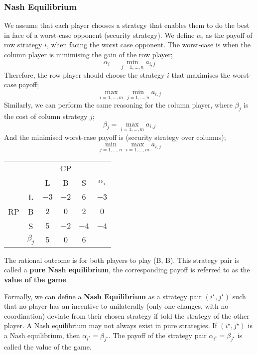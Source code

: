 \documentclass[a4paper, 12pt]{article}
\begin{document}
            \subsubsection*{Nash Equilibrium}
                We assume that each player chooses a strategy that enables them to do the best in face of a worst-case opponent (security strategy).
                We define $\alpha_i$ as the payoff of row strategy $i$, when facing the worst case opponent.
                The worst-case is when the column player is minimising the gain of the row player;
                $$\alpha_i = \min_{j = 1, \dots, n} a_{i, j}$$
                Therefore, the row player should choose the strategy $i$ that maximises the worst-case payoff;
                $$\max_{i = 1, \dots, m} \min_{j = 1, \dots, n} a_{i, j}$$
                Similarly, we can perform the same reasoning for the column player, where $\beta_j$ is the cost of column strategy $j$;
                $$\beta_j = \max_{i = 1, \dots, m} a_{i, j}$$
                And the minimised worst-case payoff is (security strategy over columns);
                $$\min_{j = 1, \dots, n} \max_{i = 1, \dots, m} a_{i, j}$$
                \begin{center}
                    \begin{tabular}{|cc|ccc|c|}
                        \hline
                        & & \multicolumn{3}{c|}{CP} & \\
                        & & L & B & S & $\alpha_i$\\
                        \hline
                        \multirow{3}{*}{RP} & L & $-3$ & $-2$ & $6$ & $-3$ \\
                        & B & $2$ & $0$ & $2$ & $0$\\
                        & S & $5$ & $-2$ & $-4$ & $-4$\\
                        \hline
                        & $\beta_j$ & $5$ & $0$ & $6$ & \\
                        \hline
                    \end{tabular}
                \end{center}
                The rational outcome is for both players to play (B, B).
                This strategy pair is called a \textbf{pure Nash equilibrium}, the corresponding payoff is referred to as the \textbf{value of the game}.
                \medskip

                Formally, we can define a \textbf{Nash Equilibrium} as a strategy pair $(i^\star, j^\star)$ such that no player has an incentive to unilaterally (only one changes, with no coordination) deviate from their chosen strategy if told the strategy of the other player.
                A Nash equilibrium may not always exist in pure strategies.
                If $(i^\star, j^\star)$ is a Nash equilibrium, then $\alpha_{i^\star} = \beta_{j^\star}$.
                The payoff of the strategy pair $\alpha_{i^\star} = \beta_{j^\star}$ is called the value of the game.
\end{document}
